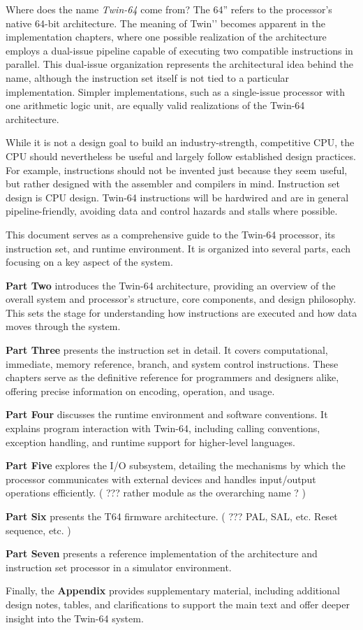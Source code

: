 Where does the name \emph{Twin-64} come from? The 64'' refers to the processor's native 64-bit architecture. The meaning of Twin’’ becomes apparent in the implementation chapters, where one possible realization of the architecture employs a dual-issue pipeline capable of executing two compatible instructions in parallel. This dual-issue organization represents the architectural idea behind the name, although the instruction set itself is not tied to a particular implementation. Simpler implementations, such as a single-issue processor with one arithmetic logic unit, are equally valid realizations of the Twin-64 architecture.



While it is not a design goal to build an industry-strength, competitive CPU, the CPU should nevertheless be useful and largely follow established design practices. For example, instructions should not be invented just because they seem useful, but rather designed with the assembler and compilers in mind. Instruction set design is CPU design. Twin-64 instructions will be hardwired and are in general pipeline-friendly, avoiding data and control hazards and stalls where possible.


This document serves as a comprehensive guide to the Twin-64 processor, its instruction set, and runtime environment. It is organized into several parts, each focusing on a key aspect of the system.

\textbf{Part Two} introduces the Twin-64 architecture, providing an overview of the overall system and processor’s structure, core components, and design philosophy. This sets the stage for understanding how instructions are executed and how data moves through the system.

\textbf{Part Three} presents the instruction set in detail. It covers computational, immediate, memory reference, branch, and system control instructions. These chapters serve as the definitive reference for programmers and designers alike, offering precise information on encoding, operation, and usage.

\textbf{Part Four} discusses the runtime environment and software conventions. It explains program interaction with Twin-64, including calling conventions, exception handling, and runtime support for higher-level languages.

\textbf{Part Five} explores the I/O subsystem, detailing the mechanisms by which the processor communicates with external devices and handles input/output operations efficiently. ( ??? rather module as the overarching name ? )

\textbf{Part Six} presents the T64 firmware architecture.  ( ??? PAL, SAL, etc. Reset sequence, etc. )

\textbf{Part Seven} presents a reference implementation of the architecture and instruction set processor in a simulator environment.

Finally, the \textbf{Appendix} provides supplementary material, including additional design notes, tables, and clarifications to support the main text and offer deeper insight into the Twin-64 system.